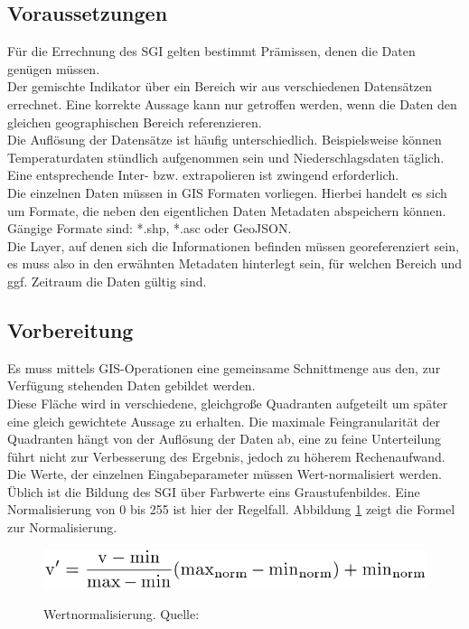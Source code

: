 \documentclass[10pt,conference,compsocconf]{IEEEtran}
\begin{document}
\subsection{Voraussetzungen}
Für die Errechnung des SGI gelten bestimmt Prämissen, denen die Daten genügen müssen.\\
Der gemischte Indikator über ein Bereich wir aus verschiedenen Datensätzen errechnet. Eine korrekte Aussage kann nur getroffen werden, wenn die Daten den gleichen geographischen Bereich referenzieren.\\
Die Auflösung der Datensätze ist häufig unterschiedlich. Beispielsweise können Temperaturdaten stündlich aufgenommen sein und Niederschlagsdaten täglich. Eine entsprechende Inter- bzw. extrapolieren ist zwingend erforderlich.\\
Die einzelnen Daten müssen in GIS Formaten vorliegen. Hierbei handelt es sich um Formate, die neben den eigentlichen Daten Metadaten abspeichern können. Gängige Formate sind: *.shp, *.asc oder GeoJSON.\\
Die Layer, auf denen sich die Informationen befinden müssen georeferenziert sein, es muss also in den erwähnten Metadaten hinterlegt sein, für welchen Bereich und ggf. Zeitraum die Daten gültig sind.


\subsection{Vorbereitung}
 Es muss mittels GIS-Operationen eine gemeinsame Schnittmenge aus den, zur Verfügung stehenden Daten gebildet werden.\\
 Diese Fläche wird in verschiedene, gleichgroße Quadranten aufgeteilt um später eine gleich gewichtete Aussage zu erhalten. Die maximale Feingranularität der Quadranten hängt von der Auflösung der Daten ab, eine zu feine Unterteilung führt nicht zur Verbesserung des Ergebnis, jedoch zu höherem Rechenaufwand.\\
 Die Werte, der einzelnen Eingabeparameter müssen Wert-normalisiert werden. Üblich ist die Bildung des SGI über Farbwerte eins Graustufenbildes. Eine Normalisierung von 0 bis 255 ist hier der Regelfall. Abbildung \ref{img:Wertnormalisierung} zeigt die Formel zur Normalisierung.\\
 \begin{figure}[H]
 	\centering
 	\includegraphics[width=1\columnwidth]{img/min_max_normalize.png} \\
 	\caption[]{Wertnormalisierung. Quelle: \cite{hagenlocher2014modeling}}
 	\label{img:Wertnormalisierung}
 \end{figure}
 
\end{document}
